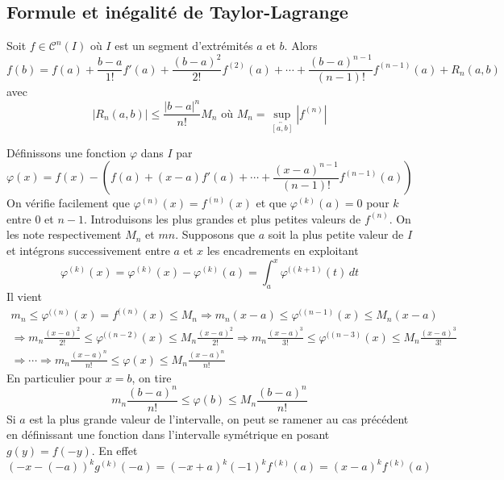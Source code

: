 \subsection{Formule et inégalité de Taylor-Lagrange}
\begin{prop}
 Soit $f\in \mathcal C^{n}(I)$ où $I$ est un segment d'extrémités $a$ et $b$. Alors 
\begin{displaymath}
 f(b)= f(a)+\frac{b-a}{1!}f'(a)+\frac{(b-a)^2}{2!}f^{(2)}(a) + \cdots +
\frac{(b-a)^{n-1}}{(n-1)!}f^{(n-1)}(a) +
R_n(a,b)
\end{displaymath}
avec
\begin{displaymath}
 |R_n(a,b)|\leq \frac{|b-a|^n}{n!}M_n \text{ où } M_n = \sup_{\overleftrightarrow{[a,b]}}\left|f^{(n)}\right|
\end{displaymath}
\end{prop}
\begin{demo}
 Définissons une fonction $\varphi$ dans $I$ par
\begin{displaymath}
 \varphi(x)=f(x)-\left(f(a)+(x-a)f'(a)+\cdots+\frac{(x-a)^{n-1}}{(n-1)!}f^{(n-1)}(a) \right) 
\end{displaymath}
On vérifie facilement que $\varphi^{(n)}(x)=f^{(n)}(x)$ et que $\varphi^{(k)}(a)=0$ pour $k$ entre $0$ et $n-1$. Introduisons les plus grandes et plus petites valeurs de $f^{(n)}$. On les note respectivement $M_n$ et $mn$. Supposons que $a$ soit la plus petite valeur de $I$ et intégrons successivement entre $a$ et $x$ les encadrements en exploitant
\begin{displaymath}
 \varphi^{(k)}(x)= \varphi^{(k)}(x) - \varphi^{(k)}(a)=\int_a^x\varphi^{((k+1)}(t)\,dt
\end{displaymath}
Il vient
\begin{multline*}
 m_n\leq \varphi^{((n)}(x)= f^{((n)}(x) \leq M_n \Rightarrow 
m_n(x-a)\leq \varphi^{((n-1)}(x) \leq M_n(x-a)\\
\Rightarrow m_n\frac{(x-a)^2}{2!}\leq \varphi^{((n-2)}(x) \leq M_n\frac{(x-a)^2}{2!}
\Rightarrow m_n\frac{(x-a)^3}{3!}\leq \varphi^{((n-3)}(x) \leq M_n\frac{(x-a)^3}{3!}\\
\Rightarrow \cdots \Rightarrow
m_n\frac{(x-a)^n}{n!}\leq \varphi(x) \leq M_n\frac{(x-a)^n}{n!}
\end{multline*}
En particulier pour $x=b$, on tire
\begin{displaymath}
 m_n \frac{(b-a)^n}{n!}\leq \varphi(b)\leq M_n \frac{(b-a)^n}{n!} 
\end{displaymath}
Si $a$ est la plus grande valeur de l'intervalle, on peut se ramener au cas précédent en définissant une fonction dans l'intervalle symétrique en posant $g(y)=f(-y)$. En effet
\begin{displaymath}
 (-x-(-a))^kg^{(k)}(-a) = (-x+a)^k(-1)^kf^{(k)}(a) = (x-a)^kf^{(k)}(a)
\end{displaymath}
\end{demo}
